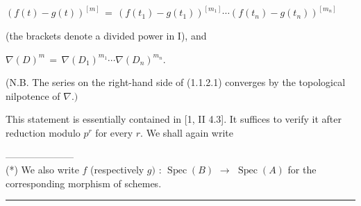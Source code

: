 \documentclass[9pt]{article}
\newcommand{\CanonText}[1]{\par{\fontsize{8.0}{9.35}\selectfont\RaggedRight #1\par}\vspace{2.2pt}}
\newcommand{\CanonDisplay}[1]{\par\vspace{1.2pt}\begin{center}{\fontsize{7.2}{8.4}\selectfont\(\displaystyle #1\)}\end{center}\vspace{1.2pt}}
\begin{document}
\begin{minipage}[t][\dimexpr\textheight-5pt\relax][t]{\textwidth}
\CanonDisplay{(f(t)-g(t))^{[m]}\,=\,(f(t_{1})-g(t_{1}))^{[m_{1}]}\cdots{}(f(t_{n})-g(t_{n}))^{[m_{n}]}}
\CanonText{(the brackets denote a divided power in I), and}
\CanonDisplay{\nabla{}(D)^{m}\,=\,\nabla{}(D_{1})^{m_{1}}\cdots{}\nabla{}(D_{n})^{m_{n}}.}
\CanonText{(N.B. The series on the right-hand side of (1.1.2.1) converges by the topological nilpotence of \(\nabla{}.)\)}
\CanonText{This statement is essentially contained in [1, II 4.3]. It suffices to verify it after reduction modulo \(p^{r}\) for every \(r\). We shall again write}
\CanonText{---------------------\\(*) We also write \(f\) (respectively \(g)\) : \(\operatorname{Spec}(B)\) \(\to{}\) \(\operatorname{Spec}(A)\) for the corresponding morphism of schemes.}
\vfill
{\color{Accent}\hrule height 0.35pt}\vspace{3pt}
\end{minipage}
\newpage
\end{document}
